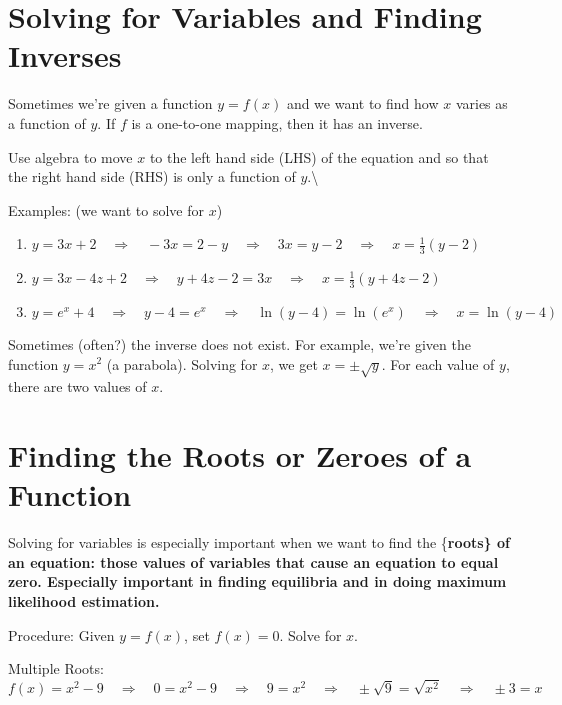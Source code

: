 \documentclass[]{book}
\theoremstyle{definition}
\theoremstyle{definition}
\theoremstyle{definition}
\theoremstyle{remark}
\begin{document}
\section{Solving for Variables and Finding
Inverses}\label{solving-for-variables-and-finding-inverses}

Sometimes we're given a function \(y=f(x)\) and we want to find how
\(x\) varies as a function of \(y\). If \(f\) is a one-to-one mapping,
then it has an inverse.

Use algebra to move \(x\) to the left hand side (LHS) of the equation
and so that the right hand side (RHS) is only a function of
\(y\).\textbackslash{}

Examples: (we want to solve for \(x\))

\begin{enumerate}
            \item $y=3x+2 \quad\Longrightarrow\quad -3x=2-y \quad\Longrightarrow\quad 3x=y-2 \quad\Longrightarrow\quad x=\frac{1}{3}(y-2)$
            \item $y=3x-4z+2 \quad \Longrightarrow\quad y+4z-2=3x \quad\Longrightarrow\quad x=\frac{1}{3}(y+4z-2)$
            \item $y=e^x+4 \quad\Longrightarrow\quad y-4=e^x \quad\Longrightarrow\quad \ln(y-4)=\ln(e^x)\quad\Longrightarrow\quad x=\ln(y-4)$
\end{enumerate}

Sometimes (often?) the inverse does not exist. For example, we're given
the function \(y=x^2\) (a parabola). Solving for \(x\), we get
\(x=\pm\sqrt{y}\). For each value of \(y\), there are two values of
\(x\).

\section{Finding the Roots or Zeroes of a
Function}\label{finding-the-roots-or-zeroes-of-a-function}

Solving for variables is especially important when we want to find the
\{\bf roots\} of an equation: those values of variables that cause an
equation to equal zero. Especially important in finding equilibria and
in doing maximum likelihood estimation.

Procedure: Given \(y=f(x)\), set \(f(x)=0\). Solve for \(x\).

Multiple Roots:
\[f(x)=x^2 - 9 \quad\Longrightarrow\quad 0=x^2 - 9 \quad\Longrightarrow\quad 9=x^2 \quad\Longrightarrow\quad \pm \sqrt{9}=\sqrt{x^2} \quad\Longrightarrow\quad \pm 3=x\]
\end{document}
